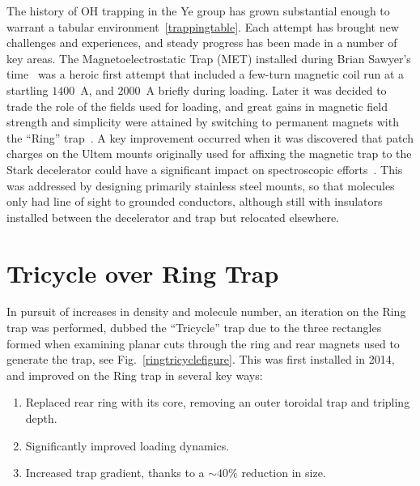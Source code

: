 \documentclass[defaultstyle,11pt]{thesis}
\begin{document}
The history of OH trapping in the Ye group has grown substantial enough to warrant a tabular environment~\ref{trappingtable}. 
Each attempt has brought new challenges and experiences, and steady progress has been made in a number of key areas.
The Magnetoelectrostatic Trap (MET) installed during Brian Sawyer's time~\cite{Sawyer2007} was a heroic first attempt that included a few-turn magnetic coil run at a startling $1400$~A, and $2000$~A briefly during loading.
Later it was decided to trade the role of the fields used for loading, and great gains in magnetic field strength and simplicity were attained by switching to permanent magnets with the ``Ring'' trap~\cite{Sawyer2011}.
A key improvement occurred when it was discovered that patch charges on the Ultem mounts originally used for affixing the magnetic trap to the Stark decelerator could have a significant impact on spectroscopic efforts~\citep[Fig.~6]{Stuhl2012uwave}.
This was addressed by designing primarily stainless steel mounts, so that molecules only had line of sight to grounded conductors, although still with insulators installed between the decelerator and trap but relocated elsewhere.

\section{Tricycle over Ring Trap}

In pursuit of increases in density and molecule number, an iteration on the Ring trap was performed, dubbed the ``Tricycle'' trap due to the three rectangles formed when examining planar cuts through the ring and rear magnets used to generate the trap, see Fig.~\ref{ringtricyclefigure}.
This was first installed in 2014, and improved on the Ring trap in several key ways:
\begin{enumerate}
\item Replaced rear ring with its core, removing an outer toroidal trap and tripling depth.
\item Significantly improved loading dynamics.
\item Increased trap gradient, thanks to a $\sim 40\%$ reduction in size.
\end{enumerate}
\end{document}
